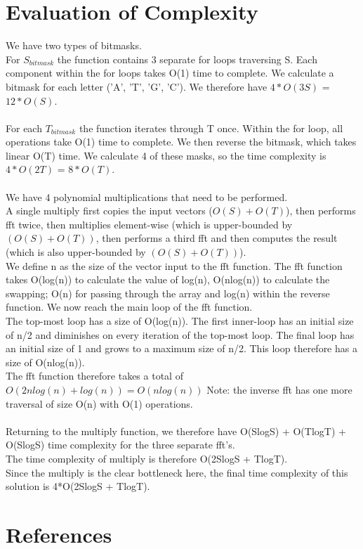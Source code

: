 \documentclass{article}
\begin{document}
\section{Evaluation of Complexity}
We have two types of bitmasks. \\ For $S_{bitmask}$ the function contains 3 separate for loops traversing S. Each component within the for loops takes O(1) time to complete. We calculate a bitmask for each letter ('A', 'T', 'G', 'C'). We therefore have $4*O(3S)$ = $12*O(S)$. \\ \\
For each $T_{bitmask}$ the function iterates through T once. Within the for loop, all operations take O(1) time to complete. We then reverse the bitmask, which takes linear O(T) time. We calculate 4 of these masks, so the time complexity is $4*O(2T)$ = $8*O(T)$. \\ \\
We have 4 polynomial multiplications that need to be performed. \\ 
A single multiply first copies the input vectors ($O(S) + O(T)$),
then performs fft twice, then multiplies element-wise (which is upper-bounded by $(O(S) + O(T))$, then performs a third fft and then computes the result (which is also upper-bounded by $(O(S) + O(T))$). \\ 
We define n as the size of the vector input to the fft function. The fft function takes O(log(n)) to calculate the value of log(n), O(nlog(n)) to calculate the swapping; O(n) for passing through the array and log(n) within the reverse function. We now reach the main loop of the fft function. \\
The top-most loop has a size of O(log(n)). The first inner-loop has an initial size of n/2 and diminishes on every iteration of the top-most loop. The final loop has an initial size of 1 and grows to a maximum size of n/2. This loop therefore has a size of O(nlog(n)). \\
The fft function therefore takes a total of $O(2nlog(n) + log(n)) = O(nlog(n))$
Note: the inverse fft has one more traversal of size O(n) with O(1) operations. \\ \\
Returning to the multiply function, we therefore have O(SlogS) + O(TlogT) + O(SlogS) time complexity for the three separate fft's. \\
The time complexity of multiply is therefore O(2SlogS + TlogT). \\
Since the multiply is the clear bottleneck here, the final time complexity of this solution is 4*O(2SlogS + TlogT).
\section*{References}
\medskip

\small
\end{document}
